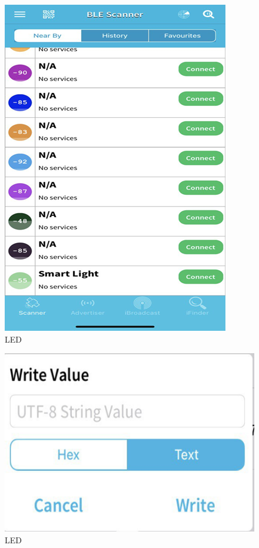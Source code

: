 \documentclass[conference]{IEEEtran}
\begin{document}
\begin{figure}[htbp]
\centerline{\includegraphics{image10.png}}
\caption{LED}
\label{fig}
\end{figure}




\begin{figure}[htbp]
\centerline{\includegraphics{image11.png}}
\caption{LED}
\label{fig}
\end{figure}
\end{document}
